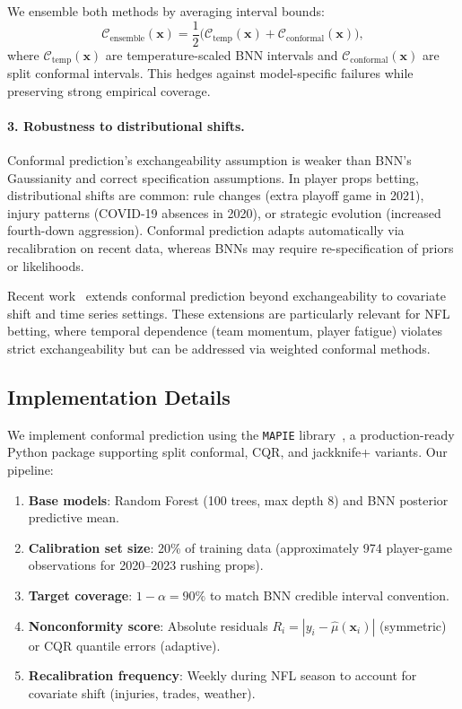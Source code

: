 We ensemble both methods by averaging interval bounds:
\begin{equation}
    \mathcal{C}_{\text{ensemble}}(\mathbf{x}) = \frac{1}{2}\big(\mathcal{C}_{\text{temp}}(\mathbf{x}) + \mathcal{C}_{\text{conformal}}(\mathbf{x})\big),
\end{equation}
where $\mathcal{C}_{\text{temp}}(\mathbf{x})$ are temperature-scaled BNN intervals and $\mathcal{C}_{\text{conformal}}(\mathbf{x})$ are split conformal intervals. This hedges against model-specific failures while preserving strong empirical coverage.

\paragraph{3. Robustness to distributional shifts.}
Conformal prediction's exchangeability assumption is weaker than BNN's Gaussianity and correct specification assumptions. In player props betting, distributional shifts are common: rule changes (extra playoff game in 2021), injury patterns (COVID-19 absences in 2020), or strategic evolution (increased fourth-down aggression). Conformal prediction adapts automatically via recalibration on recent data, whereas BNNs may require re-specification of priors or likelihoods.

Recent work~\citep{barber2023conformal} extends conformal prediction beyond exchangeability to covariate shift and time series settings. These extensions are particularly relevant for NFL betting, where temporal dependence (team momentum, player fatigue) violates strict exchangeability but can be addressed via weighted conformal methods.

\subsection{Implementation Details}\label{subsec:conformal-implementation}

We implement conformal prediction using the \texttt{MAPIE} library~\citep{taquet2021mapie}, a production-ready Python package supporting split conformal, CQR, and jackknife+ variants. Our pipeline:

\begin{enumerate}
    \item \textbf{Base models}: Random Forest (100 trees, max depth 8) and BNN posterior predictive mean.

    \item \textbf{Calibration set size}: 20\% of training data (approximately 974 player-game observations for 2020--2023 rushing props).

    \item \textbf{Target coverage}: $1 - \alpha = 90\%$ to match BNN credible interval convention.

    \item \textbf{Nonconformity score}: Absolute residuals $R_i = |y_i - \hat{\mu}(\mathbf{x}_i)|$ (symmetric) or CQR quantile errors (adaptive).

    \item \textbf{Recalibration frequency}: Weekly during NFL season to account for covariate shift (injuries, trades, weather).
\end{enumerate}

